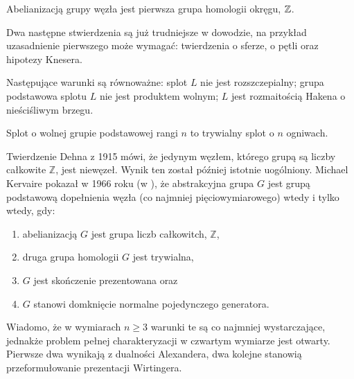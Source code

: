 \begin{corollary}
    \label{prop:knot_group_abelianisation}
    Abelianizacją grupy węzła jest pierwsza grupa homologii okręgu, $\mathbb Z$.
\end{corollary}

Dwa następne stwierdzenia są już trudniejsze w dowodzie,
na przykład uzasadnienie pierwszego może wymagać:
twierdzenia o sferze, o pętli oraz hipotezy Knesera.

\begin{proposition}
    \label{prop:knot_group_split}
    Następujące warunki są równoważne:
    splot $L$ nie jest rozszczepialny;
    grupa podstawowa splotu $L$ nie jest produktem wolnym;
    $L$ jest rozmaitością Hakena o nieściśliwym brzegu.
\end{proposition}

\begin{proposition}
    \label{prop:knot_group_free}
    Splot o wolnej grupie podstawowej rangi $n$ to trywialny splot o $n$ ogniwach.
\end{proposition}

Twierdzenie Dehna z 1915 mówi, że jedynym węzłem,
którego grupą są liczby całkowite $\mathbb Z$, jest niewęzeł.
Wynik ten został później istotnie uogólniony.
Michael Kervaire pokazał w 1966 roku (w \cite{kervaire65}),
że abstrakcyjna grupa $G$ jest grupą podstawową dopełnienia węzła
(co najmniej pięciowymiarowego) wtedy i tylko wtedy, gdy:
\begin{enumerate}[leftmargin=*]
    \itemsep0em
    \item abelianizacją $G$ jest grupa liczb całkowitch, $\mathbb Z$,
    \item druga grupa homologii $G$ jest trywialna,
    \item $G$ jest skończenie prezentowana oraz
    \item $G$ stanowi domknięcie normalne pojedynczego generatora.
\end{enumerate}

Wiadomo, że w wymiarach $n \ge 3$ warunki te są co najmniej wystarczające,
jednakże problem  pełnej charakteryzacji w czwartym wymiarze jest otwarty.
Pierwsze dwa wynikają z dualności Alexandera,
dwa kolejne stanowią przeformułowanie prezentacji Wirtingera.

